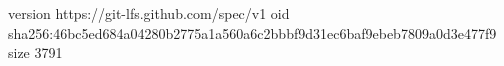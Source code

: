 version https://git-lfs.github.com/spec/v1
oid sha256:46bc5ed684a04280b2775a1a560a6c2bbbf9d31ec6baf9ebeb7809a0d3e477f9
size 3791
